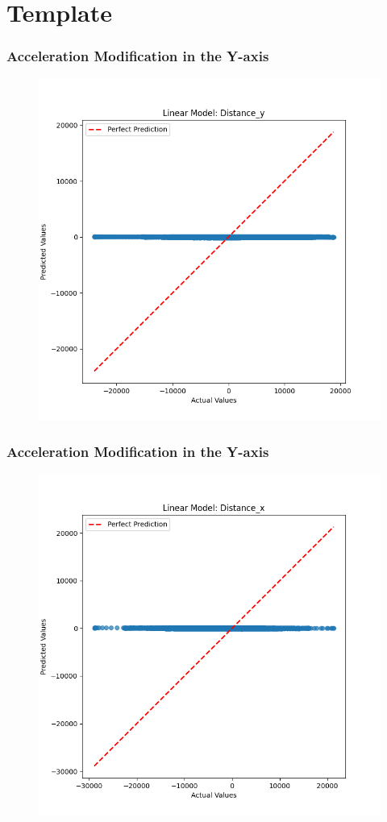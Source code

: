 
\section{Template}



\begin{frame}
  \frametitle{Acceleration Modification in the Y-axis}
  \begin{figure}
    \centering
    \includegraphics[width=0.5 \textwidth]{figures/acceleration_mod/acceleration_mod_dist_y.png}
  \end{figure}
\end{frame}


\begin{frame}
  \frametitle{Acceleration Modification in the Y-axis}
  \begin{figure}
    \centering
    \includegraphics[width=0.5 \textwidth]{figures/acceleration_mod/acceleration_mod_dist_x.png}
  \end{figure}
\end{frame}


